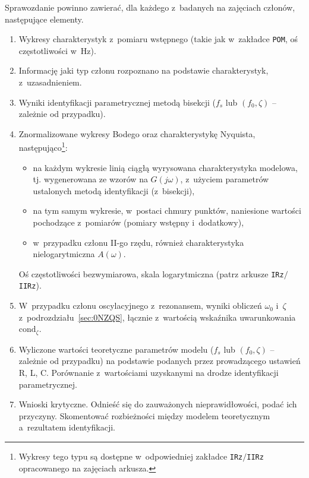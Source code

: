 \documentclass[paper=a4,DIV=12]{lpas}
\begin{document}
Sprawozdanie powinno zawierać, dla każdego z~badanych na zajęciach członów,
następujące elementy.
\begin{enumerate}
  \item Wykresy charakterystyk z~pomiaru wstępnego (takie jak w~zakładce
    \texttt{POM}, oś częstotliwości w~Hz).
  \item Informację jaki typ członu rozpoznano na podstawie charakterystyk, z~uzasadnieniem.
  \item Wyniki identyfikacji parametrycznej metodą bisekcji ($f_s$ lub $(f_0, \zeta)$ -- zależnie od przypadku).
  \item Znormalizowane wykresy Bodego oraz charakterystykę Nyquista,
    następująco\footnote{Wykresy tego typu są dostępne w~odpowiedniej
    zakładce \texttt{IRz}$/$\texttt{IIRz} opracowanego na zajęciach arkusza.}:
    \begin{itemize}
      \item na każdym wykresie linią ciągłą wyrysowana charakterystyka
        modelowa, tj. wygenerowana ze wzorów na $G(j\omega)$, z~użyciem
        parametrów ustalonych metodą identyfikacji (z~bisekcji),
      \item na tym samym wykresie, w~postaci chmury punktów, naniesione
        wartości pochodzące z~pomiarów (pomiary wstępny i~dodatkowy),
      \item w~przypadku członu II-go rzędu, również charakterystyka
        nielogarytmiczna $A(\omega)$.
    \end{itemize}
    Oś częstotliwości bezwymiarowa, skala logarytmiczna (patrz arkusze \texttt{IRz}$/$\texttt{IIRz}).
  \item W~przypadku członu oscylacyjnego z~rezonansem, wyniki obliczeń
    $\omega_0$ i~$\zeta$ z~podrozdziału~\ref{sec:0NZQS}, łącznie z~wartością
    wskaźnika uwarunkowania $\text{cond}_{\zeta}$.
  \item Wyliczone wartości teoretyczne parametrów modelu ($f_s$ lub
    $(f_0,\zeta)$ -- zależnie od przypadku) na podstawie podanych przez
    prowadzącego ustawień R, L, C. Porównanie z~wartościami uzyskanymi na
    drodze identyfikacji parametrycznej.
  \item Wnioski krytyczne. Odnieść się do zauważonych nieprawidłowości, podać
    ich przyczyny. Skomentować rozbieżności między modelem teoretycznym
    a~rezultatem identyfikacji.
\end{enumerate}
\end{document}
